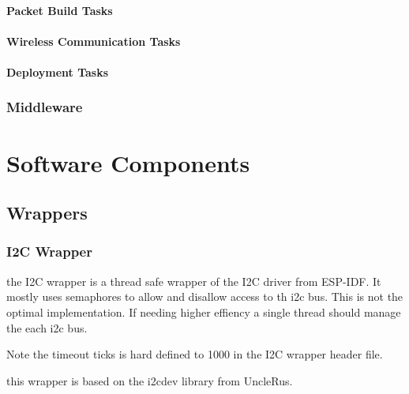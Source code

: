 \documentclass{book}
\begin{document}
\subsubsection{Packet Build Tasks}
\subsubsection{Wireless Communication Tasks}
\subsubsection{Deployment Tasks}

\subsection{Middleware}

\chapter{Software Components}

\section{Wrappers}

\subsection{I2C Wrapper}
\par the I2C wrapper is a thread safe wrapper of the I2C driver from ESP-IDF. It mostly uses semaphores to allow and disallow access to th i2c bus. This is not the optimal implementation. If needing higher effiency a single thread should manage the each i2c bus.
\par Note the timeout ticks is hard  defined to 1000 in the I2C wrapper header file. 
\par this wrapper is based on the i2cdev library from UncleRus.
\end{document}

